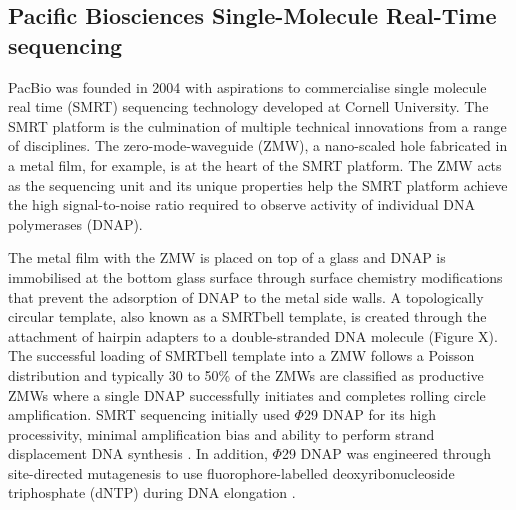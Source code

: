 \subsection{Pacific Biosciences Single-Molecule Real-Time sequencing}

PacBio was founded in 2004 with aspirations to commercialise single molecule real time (SMRT) sequencing technology developed at Cornell University. The SMRT platform is the culmination of multiple technical innovations from a range of disciplines. The zero-mode-waveguide (ZMW), a nano-scaled hole fabricated in a metal film, for example, is at the heart of the SMRT platform. The ZMW acts as the sequencing unit and its unique properties help the SMRT platform achieve the high signal-to-noise ratio required to observe activity of individual DNA polymerases (DNAP)\cite{Levene2003-og}. 

The metal film with the ZMW is placed on top of a glass and DNAP is immobilised at the bottom glass surface through surface chemistry modifications that prevent the adsorption of DNAP to the metal side walls\cite{Korlach2008-aq, Eid2009-ol}. A topologically circular template, also known as a SMRTbell template, is created through the attachment of hairpin adapters to a double-stranded DNA molecule (Figure X). The successful loading of SMRTbell template into a ZMW follows a Poisson distribution and typically 30 to 50\% of the ZMWs are classified as productive ZMWs where a single DNAP successfully initiates and completes rolling circle amplification. SMRT sequencing initially used $\Phi$29 DNAP for its high processivity, minimal amplification bias and ability to perform strand displacement DNA synthesis \cite{Eid2009-ol}. In addition, $\Phi$29 DNAP was engineered through site-directed mutagenesis to use fluorophore-labelled deoxyribonucleoside triphosphate (dNTP) during DNA elongation \cite{Korlach2008-fv,Eid2009-ol}. 

